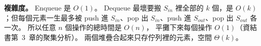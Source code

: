 \begin{pastsoln}
\textbf{複雜度。} Enqueue 是 $O(1)$。 Dequeue 最壞要搬 $S_{\mathit{in}}$ 裡全部的 $k$ 個，是
$O(k)$；但每個元素一生最多被 push 進 $S_{\mathit{in}}$、pop 出 $S_{\mathit{in}}$、push 進
$S_{\mathit{out}}$、pop 出 $S_{\mathit{out}}$ 各一次。 所以任意 $n$ 個操作的總時間是 $O(n)$，
平攤下來每個操作 $O(1)$（資結書第~3~章的聚集分析）。 兩個堆疊合起來只存佇列裡的元素，空間
$\Theta(k)$。
\end{pastsoln}
